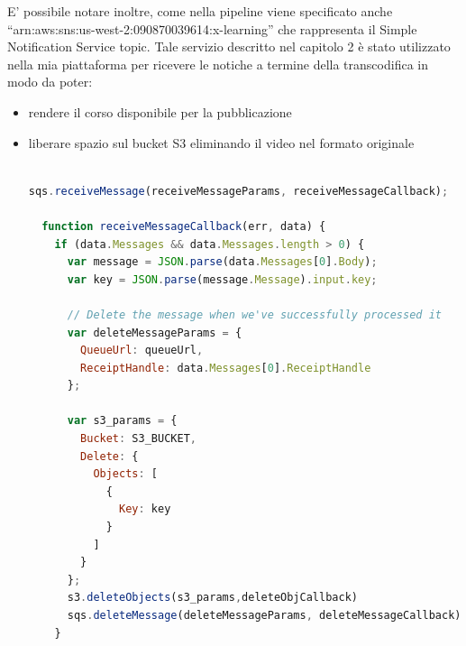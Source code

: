E' possibile notare inoltre, come nella pipeline viene specificato anche “arn:aws:sns:us-west-2:090870039614:x-learning” che rappresenta il Simple Notification Service topic.
Tale servizio descritto nel capitolo 2 è stato utilizzato nella mia piattaforma per ricevere le notiche a termine della transcodifica in modo da poter:

\begin{itemize}
\item rendere il corso disponibile per la pubblicazione
\item liberare spazio sul bucket S3 eliminando il video nel formato originale

\begin{lstlisting}[language=javascript]

sqs.receiveMessage(receiveMessageParams, receiveMessageCallback);

  function receiveMessageCallback(err, data) {
    if (data.Messages && data.Messages.length > 0) {
      var message = JSON.parse(data.Messages[0].Body);
      var key = JSON.parse(message.Message).input.key;
      
      // Delete the message when we've successfully processed it
      var deleteMessageParams = {
        QueueUrl: queueUrl,
        ReceiptHandle: data.Messages[0].ReceiptHandle
      };

      var s3_params = {
        Bucket: S3_BUCKET,
        Delete: { 
          Objects: [ 
            {
              Key: key
            }
          ]
        }
      };
      s3.deleteObjects(s3_params,deleteObjCallback)
      sqs.deleteMessage(deleteMessageParams, deleteMessageCallback);
    }
    \end{lstlisting}

\end{itemize}




